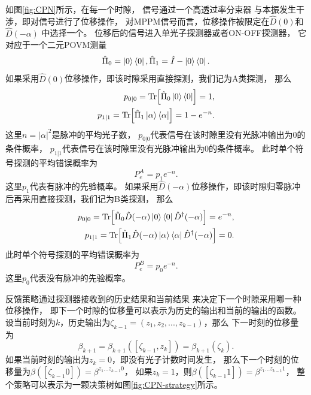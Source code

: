 如图\ref{fig:CPN}所示，在每一个时隙，
信号通过一个高透过率分束器
与本振发生干涉，即对信号进行了位移操作，
对MPPM信号而言，位移操作被限定在$\hat{D}(0)$和$\hat{D}(-\alpha)$
中选择一个。
位移后的信号进入单光子探测器或者ON-OFF探测器，
它对应于一个二元POVM测量
\begin{equation}
\hat{\Pi}_0 = \ket{0}\bra{0}, \hat{\Pi}_1 = \hat{I} - \ket{0}\bra{0}.
\end{equation}
如果采用$\hat{D}(0)$位移操作，即该时隙采用直接探测，我们记为A类探测，
那么
\begin{equation}
\begin{split}
p_{0|0} = \Tr[\hat{\Pi}_0 \ket{0}\bra{0}] = 1,\\
p_{1|1} = \Tr[\hat{\Pi}_1 \ket{\alpha}\bra{\alpha}] = 1-e^{-n}.
\end{split}
\end{equation}
这里$n=|\alpha|^2$是脉冲的平均光子数，
$p_{0|0}$代表信号在该时隙里没有光脉冲输出为0的条件概率，
$p_{1|1}$代表信号在该时隙里没有光脉冲输出为0的条件概率。
此时单个符号探测的平均错误概率为
\begin{equation}
P_e^{A} = p_1 e^{-n}.
\label{eq:DD-A-error}
\end{equation}
这里$p_1$代表有脉冲的先验概率。
如果采用$\hat{D}(-\alpha)$位移操作，即该时隙归零脉冲后再采用直接探测，我们记为B类探测，
那么
\begin{equation}
\begin{split}
p_{0|0} = \Tr[\hat{\Pi}_0 \hat{D}(-\alpha)\ket{0}\bra{0}\hat{D}^\dagger(-\alpha)] = e^{-n},\\
p_{1|1} = \Tr[\hat{\Pi}_1 \hat{D}(-\alpha)\ket{\alpha}\bra{\alpha}\hat{D}^\dagger(-\alpha)] = 0.
\end{split}
\end{equation}
此时单个符号探测的平均错误概率为
\begin{equation}
P_e^{B} = p_0 e^{-n}.
\label{eq:DD-B-error}
\end{equation}
这里$p_0$代表没有脉冲的先验概率。



反馈策略通过探测器接收到的历史结果和当前结果
来决定下一个时隙采用哪一种位移操作，
即下一个时隙的位移量可以表示为历史的输出和当前的输出的函数。
设当前时刻为$k$，历史输出为$\zeta_{k-1}=(z_1,z_2,...,z_{k-1})$，那么
下一时刻的位移量为
\begin{equation}
\beta_{k+1} = \beta_{k+1}([\zeta_{k-1} , z_k]) = \beta_{k+1}(\zeta_k).
\end{equation}
如果当前时刻的输出为$z_k=0$，即没有光子计数时间发生，
那么下一个时刻的位移量为$\beta([\zeta_{k-1} 0]) = \beta^{z_1...z_{k-1}0}$，
如果$z_k=1$，则$\beta([\zeta_{k-1} 1]) = \beta^{z_1...z_{k-1}1}$，
整个策略可以表示为一颗决策树如图\ref{fig:CPN-strategy}所示。



